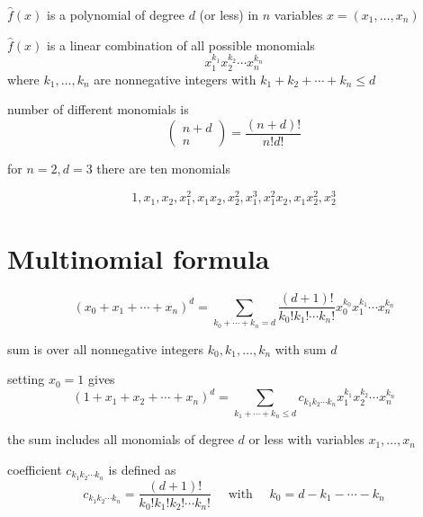 \begin{definition}
    $\hat{f}(x)$ is a polynomial of degree $d$ (or less) in $n$ variables $x=\left(x_{1}, \ldots, x_{n}\right)$

    $\hat{f}(x)$ is a linear combination of all possible monomials
    $$
    x_{1}^{k_{1}} x_{2}^{k_{2}} \cdots x_{n}^{k_{n}}
    $$
    where $k_{1}, \ldots, k_{n}$ are nonnegative integers with $k_{1}+k_{2}+\cdots+k_{n} \leq d$
\end{definition}

\begin{theorem}
    number of different monomials is
$$
\left(\begin{array}{c}
n+d \\
n
\end{array}\right)=\frac{(n+d) !}{n ! d !}
$$
\end{theorem}

\begin{example}
    for $n=2, d=3$ there are ten monomials

$$1,  x_{1},  x_{2},  x_{1}^{2},  x_{1} x_{2},  x_{2}^{2},  x_{1}^{3},  x_{1}^{2} x_{2},  x_{1} x_{2}^{2},  x_{2}^{3}$$
\end{example}


\section{Multinomial formula}

\begin{theorem}
    $$
\left(x_{0}+x_{1}+\cdots+x_{n}\right)^{d}=\sum_{k_{0}+\cdots+k_{n}=d} \frac{(d+1) !}{k_{0} ! k_{1} ! \cdots k_{n} !} x_{0}^{k_{0}} x_{1}^{k_{1}} \cdots x_{n}^{k_{n}}
$$

sum is over all nonnegative integers $k_{0}, k_{1}, \ldots, k_{n}$ with sum $d$
\end{theorem}

\begin{corollary}
    setting $x_{0}=1$ gives
$$
\left(1+x_{1}+x_{2}+\cdots+x_{n}\right)^{d}=\sum_{k_{1}+\cdots+k_{n} \leq d} c_{k_{1} k_{2} \cdots k_{n}} x_{1}^{k_{1}} x_{2}^{k_{2}} \cdots x_{n}^{k_{n}}
$$
\end{corollary}

the sum includes all monomials of degree $d$ or less with variables $x_{1}, \ldots, x_{n}$


\begin{definition}
    coefficient $c_{k_{1} k_{2} \cdots k_{n}}$ is defined as
$$
c_{k_{1} k_{2} \cdots k_{n}}=\frac{(d+1) !}{k_{0} ! k_{1} ! k_{2} ! \cdots k_{n} !} \quad \text { with } \quad k_{0}=d-k_{1}-\cdots-k_{n}
$$
\end{definition}



